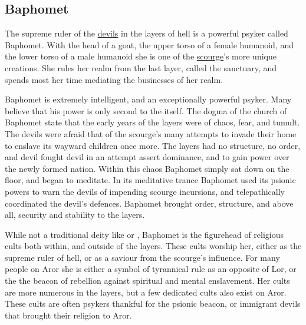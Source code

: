 \ifimages
\clearpage
{}
\clearpage
\fi

\subsection{Baphomet}
\label{sec:Baphomet}

The supreme ruler of the \hyperref[sec:Devils]{devils} in the layers of hell
is a powerful psyker called Baphomet. With the head of a goat, the upper torso
of a female humanoid, and the lower torso of a male humanoid she is one of the
\hyperref[sec:Scourge]{scourge}'s more unique creations. She rules her realm
from the last layer, called the sanctuary, and spends most her time mediating
the businesses of her realm.

Baphomet is extremely intelligent, and an exceptionally powerful psyker. Many
believe that his power is only second to the  itself. The
dogma of the church of Baphomet state that the early years of the layers were
of chaos, fear, and tumult. The devils were afraid that of the scourge's many
attempts to invade their home to enslave its wayward children once more. The
layers had no structure, no order, and devil fought devil in an attempt assert
dominance, and to gain power over the newly formed nation. Within this chaos
Baphomet simply sat down on the floor, and began to meditate. In its
meditative trance Baphomet used its psionic powers to warn the devils of
impending scourge incursions, and telepathically coordinated the devil's
defences. Baphomet brought order, structure, and above all, security and
stability to the layers.

While not a traditional deity like  or ,
Baphomet is the figurehead of religious cults both within, and outside of the
layers. These cults worship her, either as the supreme ruler of hell, or as
a saviour from the scourge's influence. For many people on Aror she is either
a symbol of tyrannical rule as an opposite of Lor, or the the beacon of
rebellion against spiritual and mental enslavement. Her cults are more
numerous in the layers, but a few dedicated cults also exist on Aror. These
cults are often psykers thankful for the psionic beacon, or immigrant devils
that brought their religion to Aror.

